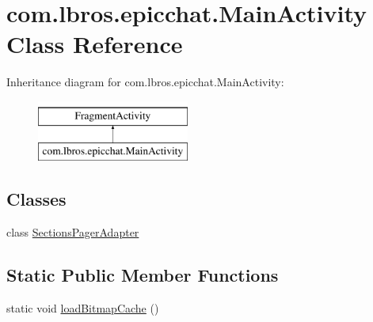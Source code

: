 \hypertarget{classcom_1_1lbros_1_1epicchat_1_1_main_activity}{\section{com.\-lbros.\-epicchat.\-Main\-Activity Class Reference}
\label{classcom_1_1lbros_1_1epicchat_1_1_main_activity}
}
Inheritance diagram for com.\-lbros.\-epicchat.\-Main\-Activity\-:\begin{figure}[H]
\begin{center}
\leavevmode
\includegraphics[height=2.000000cm]{classcom_1_1lbros_1_1epicchat_1_1_main_activity}
\end{center}
\end{figure}
\subsection*{Classes}
\begin{DoxyCompactItemize}
\item 
class \hyperlink{classcom_1_1lbros_1_1epicchat_1_1_main_activity_1_1_sections_pager_adapter}{Sections\-Pager\-Adapter}
\end{DoxyCompactItemize}
\subsection*{Static Public Member Functions}
\begin{DoxyCompactItemize}
\item 
static void \hyperlink{classcom_1_1lbros_1_1epicchat_1_1_main_activity_ad62a5d4b6cb9000e50ec68e8ec01f65e}{load\-Bitmap\-Cache} ()
\end{DoxyCompactItemize}
